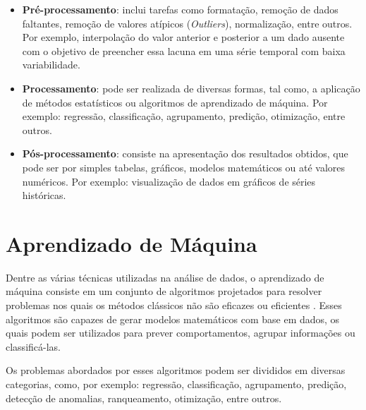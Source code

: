 \begin{itemize}
    \item \textbf{Pré-processamento}: inclui tarefas como formatação, remoção de dados faltantes, remoção de valores atípicos (\textit{Outliers}), normalização, entre outros. Por exemplo, interpolação do valor anterior e posterior a um dado ausente com o objetivo de preencher essa lacuna em uma série temporal com baixa variabilidade.
    \item \textbf{Processamento}: pode ser realizada de diversas formas, tal como, a aplicação de métodos estatísticos ou algoritmos de aprendizado de máquina. Por exemplo: regressão, classificação, agrupamento, predição, otimização, entre outros.
    \item \textbf{Pós-processamento}: consiste na apresentação dos resultados obtidos, que pode ser por simples tabelas, gráficos, modelos matemáticos ou até valores numéricos. Por exemplo: visualização de dados em gráficos de séries históricas.
\end{itemize}

\section{Aprendizado de Máquina}

Dentre as várias técnicas utilizadas na análise de dados, o aprendizado de máquina consiste em um conjunto de algoritmos projetados para resolver problemas nos quais os métodos clássicos não são eficazes ou eficientes \citep{monard2003conceitos}. Esses algoritmos são capazes de gerar modelos matemáticos com base em dados, os quais podem ser utilizados para prever comportamentos, agrupar informações ou classificá-las.

Os problemas abordados por esses algoritmos podem ser divididos em diversas categorias, como, por exemplo: regressão, classificação, agrupamento, predição, detecção de anomalias, ranqueamento, otimização, entre outros.

